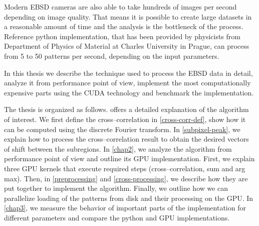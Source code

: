 Modern EBSD cameras are also able to take hundreds of images per second depending on image quality. That means it is possible to create large datasets in a reasonable amount of time and the analysis is the bottleneck of the process. Reference python implementation, that has been provided by physicists from Department of Physics of Material at Charles University in Prague, can process from 5 to 50 patterns per second, depending on the input parameters.

In this thesis we describe the technique used to process the EBSD data in detail, analyze it from performance point of view, implement the most computationally expensive parts using the CUDA technology and benchmark the implementation.

The thesis is organized as follows.  offers a detailed explanation of the algorithm of interest. We first define the cross--correlation in \cref{cross-corr-def}, show how it can be computed using the discrete Fourier transform. In \cref{subpixel-peak}, we explain how to process the cross--correlation result to obtain the desired vectors of shift between the subregions. In \cref{chap2}, we analyze the algorithm from performance point of view and outline its GPU implementation. First, we explain three GPU kernels that execute required steps (cross--correlation, sum and arg max). Then, in \cref{preprocessing} and \cref{cross-processing}, we describe how they are put together to implement the algorithm. Finally, we outline how we can parallelize loading of the patterns from disk and their processing on the GPU. In \cref{chap3}, we measure the behavior of important parts of the implementation for different parameters and compare the python and GPU implementations.


